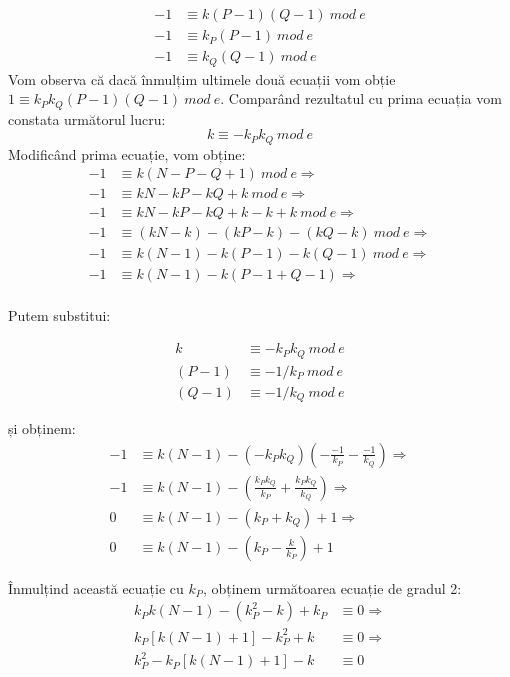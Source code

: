 \documentclass[12pt, oneside]{book}
\begin{document}
\begin{equation}
\begin{split}
-1 &\equiv k(P-1)(Q-1) \ mod \ e \\
-1 &\equiv k_P(P-1) \ mod \ e \\
-1 &\equiv k_Q(Q-1) \ mod \ e
\end{split}
\end{equation}
Vom observa că dacă înmulțim ultimele două ecuații vom obție $ 1 \equiv k_Pk_Q(P-1)(Q-1) \ mod \ e$. Comparând rezultatul cu prima ecuația vom constata următorul lucru:
$$ k \equiv -k_Pk_Q \ mod \ e $$
Modificând prima ecuație, vom obține:
\begin{align*}
 -1 &\equiv k(N-P-Q+1) \ mod \ e \Rightarrow \\
 -1 &\equiv kN - kP - kQ +k \ mod \ e \Rightarrow \\
 -1 &\equiv kN-kP-kQ + k - k + k \ mod \ e \Rightarrow \\
 -1 &\equiv (kN-k) - (kP - k ) - (kQ - k ) \ mod \ e \Rightarrow \\
 -1 &\equiv k(N-1) -k(P-1) - k(Q-1) \ mod \ e  \Rightarrow \\
 -1 &\equiv k(N-1) -k(P-1+Q-1) \Rightarrow \\
\end{align*}


Putem substitui:

\begin{align*}
k &\equiv -k_P k_Q \ mod \ e \\
(P-1) &\equiv -1/k_P \ mod \ e \\
(Q-1) &\equiv -1/k_Q \ mod \ e
\end{align*}

și obținem:
\begin{align*}
-1 &\equiv k(N-1) -(-k_Pk_Q)(-\frac{-1}{k_P} - \frac{-1}{k_Q}) \Rightarrow  \\
-1 &\equiv k(N-1) - (\frac{k_Pk_Q}{k_P} + \frac{k_Pk_Q}{k_Q}) \Rightarrow  \\
0  &\equiv  k(N-1) - (k_P + k_Q) +1 \Rightarrow \\
0  &\equiv k(N-1) - (k_P - \frac{k}{k_P}) +1
\end{align*}


Înmulțind această ecuație cu $k_P$, obținem următoarea ecuație de gradul 2:
\begin{align*}
k_Pk(N-1) - (k_{P}^{2} - k) +k_P &\equiv 0 \Rightarrow \\
k_P[k(N-1)+1] - k_{P}^{2} + k &\equiv 0 \Rightarrow \\
k_{P}^{2} - k_P[k(N-1)+1] - k &\equiv 0
\end{align*}
\end{document}
